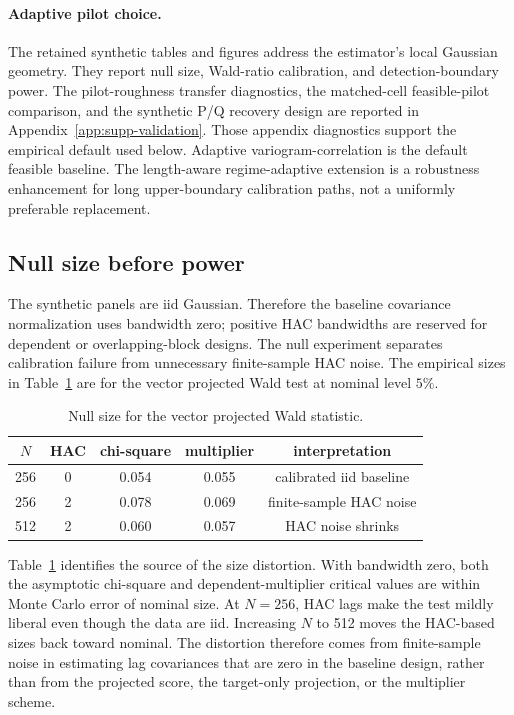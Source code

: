 \documentclass[11pt,a4paper]{amsart}
\theoremstyle{plain}
\theoremstyle{definition}
\theoremstyle{remark}
\begin{document}
\paragraph{Adaptive pilot choice.}
The retained synthetic tables and figures address the estimator's local Gaussian geometry.  They
report null size, Wald-ratio calibration, and detection-boundary power.  The pilot-roughness
transfer diagnostics, the matched-cell feasible-pilot comparison, and the synthetic P/Q recovery
design are reported in Appendix~\ref{app:supp-validation}.  Those appendix diagnostics support the empirical default used below.  Adaptive
variogram-correlation is the default feasible baseline.  The length-aware regime-adaptive extension
is a robustness enhancement for long upper-boundary calibration paths, not a uniformly preferable
replacement.

\subsection{Null size before power}

The synthetic panels are iid Gaussian.  Therefore the baseline covariance normalization uses
bandwidth zero; positive HAC bandwidths are reserved for dependent or overlapping-block designs.
The null experiment separates calibration failure from unnecessary finite-sample HAC noise.  The
empirical sizes in Table~\ref{tab:null-size} are for the vector projected Wald test at nominal level
\(5\%\).

\begin{table}[htbp]
\centering
\caption{Null size for the vector projected Wald statistic.}
\label{tab:null-size}
\small
\begin{tabular}{ccccc}
\toprule
\(N\) & HAC & chi-square & multiplier & interpretation\\
\midrule
256 & 0 & 0.054 & 0.055 & calibrated iid baseline\\
256 & 2 & 0.078 & 0.069 & finite-sample HAC noise\\
512 & 2 & 0.060 & 0.057 & HAC noise shrinks\\
\bottomrule
\end{tabular}
\end{table}

Table~\ref{tab:null-size} identifies the source of the size distortion.  With bandwidth zero, both the
asymptotic chi-square and dependent-multiplier critical values are within Monte Carlo error of
nominal size.  At \(N=256\), HAC lags make the test mildly liberal even though the data are iid.  Increasing \(N\) to 512 moves the HAC-based sizes back toward nominal.  The distortion therefore comes from finite-sample noise in estimating lag covariances that are zero
in the baseline design, rather than from the projected score, the target-only projection, or the
multiplier scheme.
\end{document}
